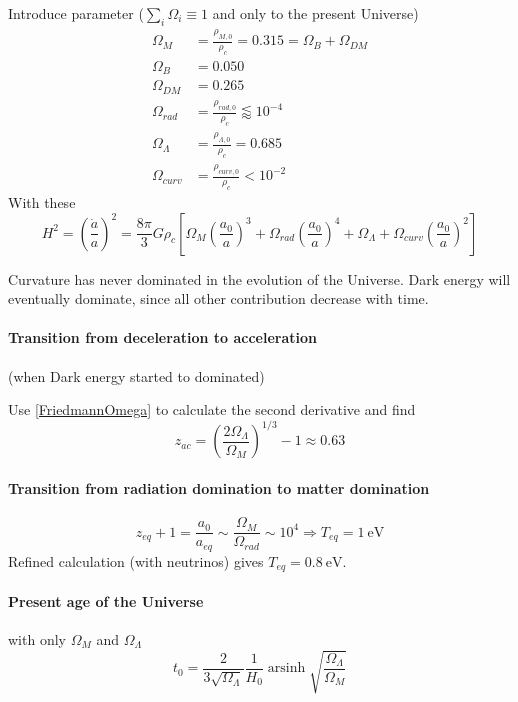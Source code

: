 \documentclass[12pt, a4paper, DIV=15]{article}
\numberwithin{equation}{section}
\DeclareMathOperator{\arsinh}{arsinh}
\begin{document}
Introduce parameter ($\sum_i \Omega_i \equiv 1$ and only to the present Universe)
\begin{align}
   \Omega_M &= \frac{\rho_{M, 0}}{\rho_c}=0.315 =\Omega_B + \Omega_{DM} \\
   \Omega_B &= 0.050 \\
   \Omega_{DM} &= 0.265 \\
   \Omega_{rad} &= \frac{\rho_{rad,0}}{\rho_c} \lessapprox 10^{-4} \\
   \Omega_{\Lambda} &= \frac{\rho_{\Lambda,0}}{\rho_c} = 0.685\\
   \Omega_{curv} &= \frac{\rho_{curv,0}}{\rho_c} < 10^{-2}
\end{align}
With these
\begin{equation}
   H^2 = \left( \frac{\dot{a}}{a} \right)^2 = \frac{8\pi}{3} G \rho_c \left[ \Omega_M \left( \frac{a_0}{a} \right)^3 + \Omega_{rad} \left( \frac{a_0}{a} \right)^4 + \Omega_\Lambda + \Omega_{curv} \left( \frac{a_0}{a} \right)^2 \right] \label{FriedmannOmega}
\end{equation}

Curvature has never dominated in the evolution of the Universe. Dark energy will eventually dominate, since all other contribution decrease with time.

\paragraph{Transition from deceleration to acceleration} (when Dark energy started to dominated)

Use \eqref{FriedmannOmega} to calculate the second derivative and find
\begin{equation}
   z_{ac} = \left( \frac{2 \Omega_\Lambda}{\Omega_M} \right)^{1/3} - 1 \approx 0.63
\end{equation}

\paragraph{Transition from radiation domination to matter domination}
\begin{equation}
   z_{eq} + 1 = \frac{a_0}{a_{eq}} \sim \frac{\Omega_M}{\Omega_{rad}} \sim 10^4 \Rightarrow T_{eq} = \SI{1}{\eV}
\end{equation}
Refined calculation (with neutrinos) gives $T_{eq} = \SI{0.8}{\eV}$.

\paragraph{Present age of the Universe}
with only $\Omega_M$ and $\Omega_\Lambda$
\begin{equation}
   t_0 = \frac{2}{3\sqrt{\Omega_\Lambda}} \frac{1}{H_0} \arsinh \sqrt{\frac{\Omega_\Lambda}{\Omega_M}} 
\end{equation}
\end{document}
